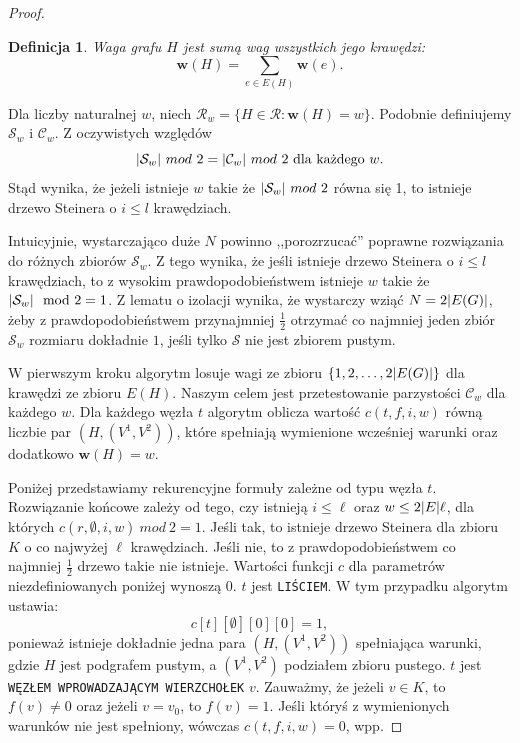 \documentclass[12pt, oneside]{report}
\newtheorem{definition}{Definicja}
\begin{document}
\begin{proof}
\begin{definition}
\em \emph{Waga grafu $H$} jest sumą wag wszystkich jego krawędzi:
$$\mathbf{w}(H) = \sum_{e \in E(H)} \mathbf{w}(e).$$
\end{definition}
Dla liczby naturalnej $w$, niech $\mathcal{R}_w = \{H \in \mathcal{R} : \mathbf{w}(H) = w\}$. Podobnie definiujemy $\mathcal{S}_w$ i $\mathcal{C}_w$. Z oczywistych względów $$\abs{\mathcal{S}_w} \ mod \ 2 = \abs{\mathcal{C}_w} \ mod \ 2 \ \text{dla każdego} \ w.$$ Stąd wynika, że jeżeli istnieje $w$ takie że $\abs{\mathcal{S}_w} \ mod \ 2$ równa się 1, to istnieje drzewo Steinera o $i \leq l$ krawędziach.

Intuicyjnie, wystarczająco duże $N$ powinno ,,porozrzucać'' poprawne rozwiązania do różnych zbiorów $\mathcal{S}_w$. Z tego wynika, że jeśli istnieje drzewo Steinera o $i \leq l$ krawędziach, to z wysokim prawdopodobieństwem istnieje $w$ takie że $\abs{\mathcal{S}_w} \mod 2 = 1$. Z lematu o izolacji wynika, że wystarczy wziąć $N = 2\abs{E(G)}$, żeby z prawdopodobieństwem przynajmniej $\frac{1}{2}$ otrzymać co najmniej jeden zbiór $\mathcal{S}_w$ rozmiaru dokładnie $1$, jeśli tylko $\mathcal{S}$ nie jest zbiorem pustym.

W pierwszym kroku algorytm losuje wagi ze zbioru $\{1,2, \ldots, 2 \abs{E(G)}\}$ dla krawędzi ze zbioru $E(H)$. Naszym celem jest przetestowanie parzystości $\mathcal{C}_w$ dla każdego $w$. Dla każdego węzła $t$ algorytm oblicza wartość $c(t, f, i, w)$ równą liczbie par $(H, (V^1, V^2))$, które spełniają wymienione wcześniej warunki oraz dodatkowo $\mathbf{w}(H) = w$.

Poniżej przedstawiamy rekurencyjne formuły zależne od typu węzła $t$. Rozwiązanie końcowe zależy od tego, czy istnieją $i \leq \ell$ oraz $w  \leq 2\abs{E}\ell$, dla których  $c(r,\emptyset,i,w) \ mod \ 2 = 1$. Jeśli tak, to istnieje drzewo Steinera dla zbioru $K$ o co najwyżej $\ell$ krawędziach. Jeśli nie, to z prawdopodobieństwem co najmniej $\frac{1}{2}$ drzewo takie nie istnieje. Wartości funkcji $c$ dla parametrów niezdefiniowanych poniżej wynoszą $0$.
\newline\newline
$t$ jest \texttt{LIŚCIEM}. W tym przypadku algorytm ustawia:
$$c[t][\emptyset][0][0] = 1,$$ ponieważ istnieje dokładnie jedna para $(H, (V^1, V^2))$ spełniająca warunki, gdzie $H$ jest podgrafem pustym, a $(V^1, V^2)$ podziałem zbioru pustego.
\newline\newline
$t$ jest \texttt{WĘZŁEM WPROWADZAJĄCYM WIERZCHOŁEK} $v$. Zauważmy, że jeżeli $v \in K$, to $f(v) \neq 0$ oraz jeżeli $v = v_0$, to $f(v) = 1$. Jeśli któryś z wymienionych warunków nie jest spełniony, wówczas $c(t,f,i,w) = 0$, wpp.


\end{proof}
\end{document}
